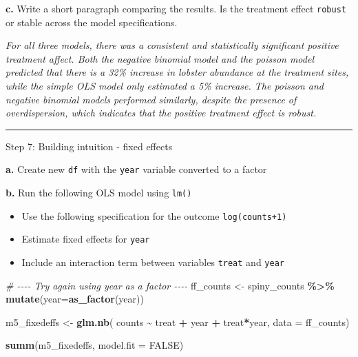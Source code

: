 \documentclass[
]{article}
\newenvironment{Shaded}{\begin{snugshade}}{\end{snugshade}}
\newcommand{\AttributeTok}[1]{\textcolor[rgb]{0.13,0.29,0.53}{#1}}
\newcommand{\CommentTok}[1]{\textcolor[rgb]{0.56,0.35,0.01}{\textit{#1}}}
\newcommand{\ConstantTok}[1]{\textcolor[rgb]{0.56,0.35,0.01}{#1}}
\newcommand{\FunctionTok}[1]{\textcolor[rgb]{0.13,0.29,0.53}{\textbf{#1}}}
\newcommand{\NormalTok}[1]{#1}
\newcommand{\OtherTok}[1]{\textcolor[rgb]{0.56,0.35,0.01}{#1}}
\newcommand{\SpecialCharTok}[1]{\textcolor[rgb]{0.81,0.36,0.00}{\textbf{#1}}}
\providecommand{\tightlist}{%
  \setlength{\itemsep}{0pt}\setlength{\parskip}{0pt}}
\begin{document}
\textbf{c.} Write a short paragraph comparing the results. Is the
treatment effect \texttt{robust} or stable across the model
specifications.

\emph{For all three models, there was a consistent and statistically
significant positive treatment affect. Both the negative binomial model
and the poisson model predicted that there is a 32\% increase in lobster
abundance at the treatment sites, while the simple OLS model only
estimated a 5\% increase. The poisson and negative binomial models
performed similarly, despite the presence of overdispersion, which
indicates that the positive treatment effect is robust.}

\begin{center}\rule{0.5\linewidth}{0.5pt}\end{center}

Step 7: Building intuition - fixed effects

\textbf{a.} Create new \texttt{df} with the \texttt{year} variable
converted to a factor

\textbf{b.} Run the following OLS model using \texttt{lm()}

\begin{itemize}
\tightlist
\item
  Use the following specification for the outcome \texttt{log(counts+1)}
\item
  Estimate fixed effects for \texttt{year}
\item
  Include an interaction term between variables \texttt{treat} and
  \texttt{year}
\end{itemize}

\begin{Shaded}
\begin{Highlighting}[]
\CommentTok{\# {-}{-}{-}{-} Try again using \textquotesingle{}year\textquotesingle{} as a factor {-}{-}{-}{-}}
\NormalTok{ff\_counts }\OtherTok{\textless{}{-}}\NormalTok{ spiny\_counts }\SpecialCharTok{\%\textgreater{}\%} 
    \FunctionTok{mutate}\NormalTok{(}\AttributeTok{year=}\FunctionTok{as\_factor}\NormalTok{(year))}
    
\NormalTok{m5\_fixedeffs }\OtherTok{\textless{}{-}} \FunctionTok{glm.nb}\NormalTok{(}
\NormalTok{    counts }\SpecialCharTok{\textasciitilde{}} 
\NormalTok{        treat }\SpecialCharTok{+}
\NormalTok{        year }\SpecialCharTok{+}
\NormalTok{        treat}\SpecialCharTok{*}\NormalTok{year,}
    \AttributeTok{data =}\NormalTok{ ff\_counts)}

\FunctionTok{summ}\NormalTok{(m5\_fixedeffs, }\AttributeTok{model.fit =} \ConstantTok{FALSE}\NormalTok{)}
\end{Highlighting}
\end{Shaded}
\end{document}
